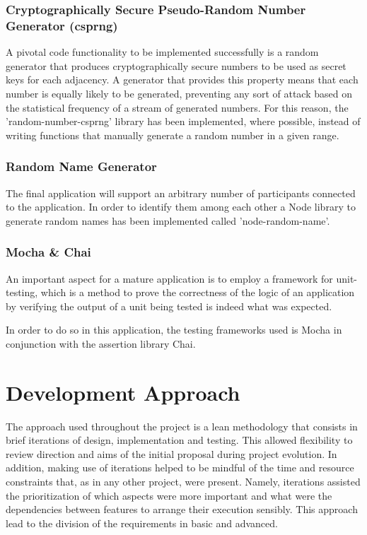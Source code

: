 \subsubsection{Cryptographically Secure Pseudo-Random Number Generator (csprng)}
A pivotal code functionality to be implemented successfully is a random generator that produces cryptographically secure numbers to be used as secret keys for each adjacency. A generator that provides this property means that each number is equally likely to be generated, preventing any sort of attack based on the statistical frequency of a stream of generated numbers. 
For this reason, the 'random-number-csprng' library has been implemented, where possible, instead of writing functions that manually generate a random number in a given range.

\subsubsection{Random Name Generator}
The final application will support an arbitrary number of participants connected to the application. In order to identify them among each other a Node library to generate random names has been implemented called 'node-random-name'. 

\subsubsection{Mocha \& Chai}
An important aspect for a mature application is to employ a framework for unit-testing, which is a method to prove the correctness of the logic of an application by verifying the output of a unit being tested is indeed what was expected.

In order to do so in this application, the testing frameworks used is Mocha in conjunction with the assertion library Chai. 


\section{Development Approach}
The approach used throughout the project is a lean methodology that consists in brief iterations of design, implementation and testing. This allowed flexibility to review direction and aims of the initial proposal during project evolution. In addition, making use of iterations helped to be mindful of the time and resource constraints that, as in any other project, were present. Namely, iterations assisted the prioritization of which aspects were more important and what were the dependencies between features to arrange their execution sensibly. This approach lead to the division of the requirements in basic and advanced.


